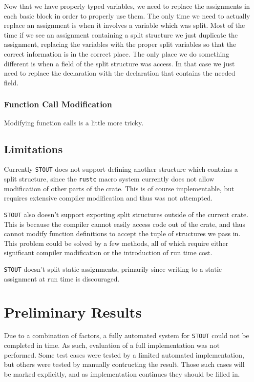 \documentclass[prodmode,acmtecs]{acmsmall} %
\newcommand{\rustcname}{{\texttt{rustc}}}
\def \rustc {\rustcname{}\xspace}
\newcommand{\projectname}{{\texttt{STOUT}}}
\def \name{\projectname\xspace}
\begin{document}
Now that we have properly typed variables, we need to replace the assignments
in each basic block in order to properly use them. The only time we need
to actually replace an assignment is when it involves a variable which was
split.  
Most of the time if we see an assignment containing a split structure
we just duplicate the assignment, replacing the variables with the proper 
split variables so that the correct information is in the
correct place. The only place we do something different is when
a field of the split structure was access. In that case we 
just need to replace the declaration with the declaration
that contains the needed field.

\subsubsection{Function Call Modification}
\label{sec:funcall}

Modifying function calls is a little more tricky. 

\subsection{Limitations}
\label{sec:limits}
Currently \name does not support defining another structure
which contains a split structure, since the \rustc macro system
currently does not allow modification of other parts of the 
crate. This is of course implementable, but requires extensive
compiler modification and thus was not attempted.

\name also doesn't support exporting split structures outside of the 
current crate.
This is because the compiler cannot easily access code out of the crate, and
thus cannot modify function definitions to accept the tuple of structures we
pass in. This problem could be solved by a few methods, all of which require
either significant compiler modification or the introduction of run
time cost. 

\name doesn't split static assignments, primarily since writing to a static
assignment at run time is discouraged.

\section{Preliminary Results}
Due to a combination of factors, a fully automated system for \name could not
be completed in time. As such, evaluation of a full implementation
was not performed. Some test cases were tested by a limited automated implementation,
but others were tested by manually contructing the result. Those such cases
will be marked explicitly, and as implementation continues they should be filled in.
\end{document}
